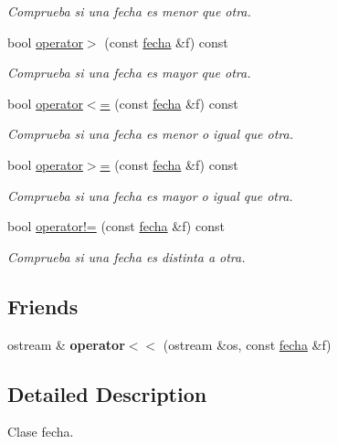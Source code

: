 \begin{DoxyCompactItemize}
\begin{DoxyCompactList}\small\item\em Comprueba si una fecha es menor que otra. \end{DoxyCompactList}\item 
bool \hyperlink{classfecha_aaded7646e80d88492b31b17b4fb001fd}{operator$>$} (const \hyperlink{classfecha}{fecha} \&f) const 
\begin{DoxyCompactList}\small\item\em Comprueba si una fecha es mayor que otra. \end{DoxyCompactList}\item 
bool \hyperlink{classfecha_a8dfb2f2a7424bdb1dacc6df122b0a0c8}{operator$<$=} (const \hyperlink{classfecha}{fecha} \&f) const 
\begin{DoxyCompactList}\small\item\em Comprueba si una fecha es menor o igual que otra. \end{DoxyCompactList}\item 
bool \hyperlink{classfecha_a98d0f3009cb7205b5ddb3b81596d9cc7}{operator$>$=} (const \hyperlink{classfecha}{fecha} \&f) const 
\begin{DoxyCompactList}\small\item\em Comprueba si una fecha es mayor o igual que otra. \end{DoxyCompactList}\item 
bool \hyperlink{classfecha_a1f6d28759c45b138efb80d25a7c398b8}{operator!=} (const \hyperlink{classfecha}{fecha} \&f) const 
\begin{DoxyCompactList}\small\item\em Comprueba si una fecha es distinta a otra. \end{DoxyCompactList}\end{DoxyCompactItemize}
\subsection*{Friends}
\begin{DoxyCompactItemize}
\item 
\hypertarget{classfecha_a9787de38b43ae62ba2c0812f3dd18394}{ostream \& {\bfseries operator$<$$<$} (ostream \&os, const \hyperlink{classfecha}{fecha} \&f)}\label{classfecha_a9787de38b43ae62ba2c0812f3dd18394}

\end{DoxyCompactItemize}


\subsection{Detailed Description}
Clase fecha. 

